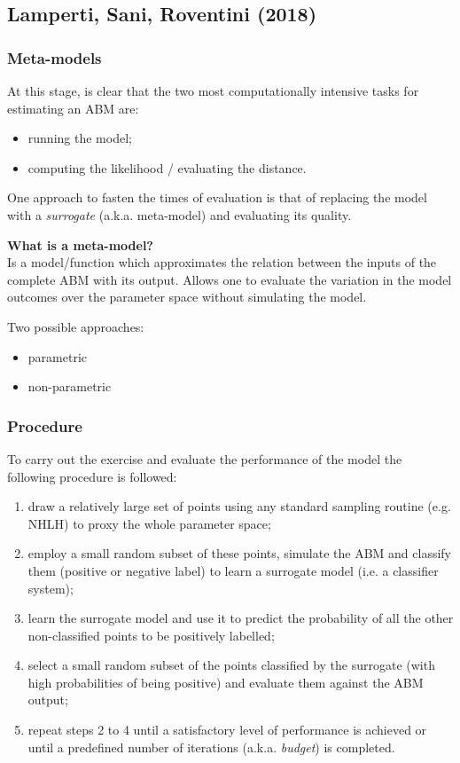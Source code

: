 \documentclass[10pt]{beamer}
\begin{document}
\subsection{Lamperti, Sani, Roventini (2018)}


\begin{frame}[c]\frametitle{Meta-models}
	At this stage, is clear that the two most computationally intensive tasks for estimating an ABM are:
	\begin{itemize}
		\item running the model;
		\item computing the likelihood / evaluating the distance.
	\end{itemize} \medskip

	One approach to fasten the times of evaluation is that of replacing the model with a \emph{surrogate} (a.k.a. meta-model) and evaluating its quality. \medskip

	\alert{\textbf{What is a meta-model?}}
	\\ Is a model/function which approximates the relation between the inputs of the complete ABM with its output. Allows one to evaluate the variation in the model outcomes over the parameter space without simulating the model. \medskip

	Two possible approaches:
	\begin{itemize}
		\item parametric \citep[see][]{salle2014kriging,dosi2018sensitivity}
		\item non-parametric \citep[see][]{lamperti2018surrogates}
	\end{itemize}
\end{frame}


\begin{frame}[c]\frametitle{Procedure}
To carry out the exercise and evaluate the performance of the model the following procedure is followed:
	\begin{enumerate}
		\item draw a relatively large set of points using any standard sampling routine (e.g. NHLH) to proxy the whole parameter space;
		\item employ a small random subset of these points, simulate the ABM and classify them (positive or negative label) to learn a surrogate model (i.e. a classifier system);
		\item learn the surrogate model and use it to predict the probability of all the other non-classified points to be positively labelled;
		\item select a small random subset of the points classified by the surrogate (with high probabilities of being positive) and evaluate them against the ABM output;
		\item repeat steps 2 to 4 until a satisfactory level of performance is achieved or until a predefined number of iterations (a.k.a. \emph{budget}) is completed.
	\end{enumerate}
\end{frame}
\end{document}
